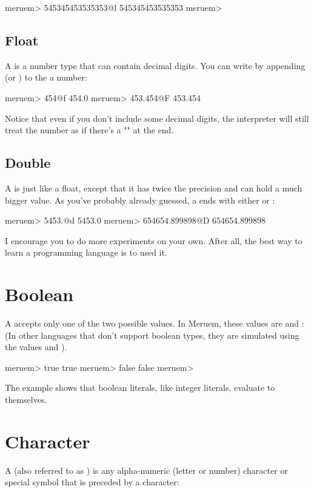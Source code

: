 \begin{REPL}
meruem> 545345453535353@l
545345453535353
meruem>
\end{REPL}

\subsection{Float}
A  is a number type that can contain decimal digits. You can write  by appending  (or ) to the a number:

\begin{REPL}
meruem> 454@f
454.0
meruem> 453.454@F
453.454
\end{REPL}

Notice that even if you don't include some decimal digits, the interpreter will still treat the number as if there's a "" at the end.

\subsection{Double}
A  is just like a float, except that it has twice the precision and can hold a much bigger value. As you've probably already guessed, a  ends with either  or :

\begin{REPL}
meruem> 5453.@d
5453.0
meruem> 654654.899898@D
654654.899898
\end{REPL}

I encourage you to do more experiments on your own. After all, the best way to learn a programming language is to used it.

\section{Boolean}
A  accepts only one of the two possible values. In Meruem, these values are  and : (In other languages that don't support boolean types, they are simulated using the values  and ). 

\begin{REPL}
meruem> true
true
meruem> false
false
meruem>  
\end{REPL}

The example shows that boolean literals, like integer literals, evaluate to themselves.

\section{Character}
A  (also referred to as ) is any alpha-numeric (letter or number) character or special symbol that is preceded by a \code{\textbackslash} character:

